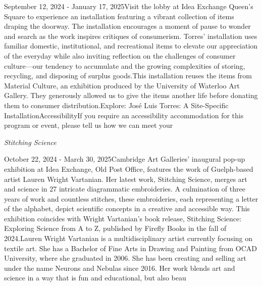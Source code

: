 \documentclass[letterpaper, 10pt]{article}
\newcommand{\subtitle}[1]{\textit{\large #1}\vspace{0.5em}}
\newcommand{\articlecontent}[1]{\small #1\vspace{1em}}
\begin{document}
\begin{multicols}{2}
{
\vspace{10px}

September 12, 2024 - January 17, 2025Visit the lobby at Idea Exchange Queen's Square to experience an installation featuring a vibrant collection of items draping the doorway. The installation encourages a moment of pause to wonder and search as the work inspires critiques of consumerism. Torres’ installation uses familiar domestic, institutional, and recreational items to elevate our appreciation of the everyday while also inviting reflection on the challenges of consumer culture—our tendency to accumulate and the growing complexities of storing, recycling, and disposing of surplus goods.This installation reuses the items from Material Culture, an exhibition produced by the University of Waterloo Art Gallery. They generously allowed us to give the items another life before donating them to consumer distribution.Explore: José Luis Torres: A Site-Specific InstallationAccessibilityIf you require an accessibility accommodation for this program or event, please tell us how we can meet your
}
\vspace{10px}

\subtitle{Stitching Science}

\articlecontent{

\qrcode[height=1.5cm]{https://ideaexchange.libnet.info/event/12110995}
\vspace{10px}

October 22, 2024 - March 30, 2025Cambridge Art Galleries' inaugural pop-up exhibition at Idea Exchange, Old Post Office, features the work of Guelph-based artist Lauren Wright Vartanian. Her latest work, Stitching Science, merges art and science in 27 intricate diagrammatic embroideries. A culmination of three years of work and countless stitches, these embroideries, each representing a letter of the alphabet, depict scientific concepts in a creative and accessible way. This exhibition coincides with Wright Vartanian’s book release, Stitching Science: Exploring Science from A to Z, published by Firefly Books in the fall of 2024.Lauren Wright Vartanian is a multidisciplinary artist currently focusing on textile art. She has a Bachelor of Fine Arts in Drawing and Painting from OCAD University, where she graduated in 2006. She has been creating and selling art under the name Neurons and Nebulas since 2016. Her work blends art and science in a way that is fun and educational, but also beau
}
\vspace{10px}


\end{multicols}
\end{document}

